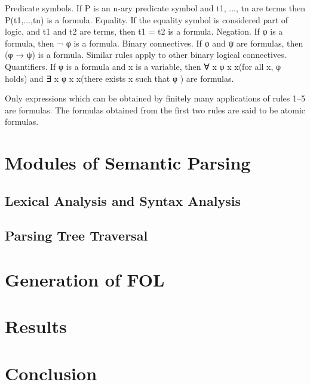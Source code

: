 \documentclass{article}
\begin{document}
{{		Predicate symbols. If P is an n-ary predicate symbol and t1, ..., tn are terms then P(t1,...,tn) is a formula.
		Equality. If the equality symbol is considered part of logic, and t1 and t2 are terms, then t1 = t2 is a formula.
		Negation. If φ is a formula, then ¬ {\displaystyle \lnot } \lnot φ is a formula.
		Binary connectives. If φ and ψ are formulas, then (φ → {\displaystyle \rightarrow } \rightarrow ψ) is a formula. Similar rules apply to other binary logical connectives.
		Quantifiers. If φ {\displaystyle \varphi } \varphi is a formula and x is a variable, then ∀ x φ {\displaystyle \forall x\varphi } \forall x\varphi (for all x, φ {\displaystyle \varphi } \varphi holds) and ∃ x φ {\displaystyle \exists x\varphi } \exists x\varphi (there exists x such that φ {\displaystyle \varphi } \varphi ) are formulas.

		Only expressions which can be obtained by finitely many applications of rules 1–5 are formulas. The formulas obtained from the first two rules are said to be atomic formulas.
	}
}

\section{Modules of Semantic Parsing}{
	\subsection{Lexical Analysis and Syntax Analysis}{}

	\subsection{Parsing Tree Traversal}{}
}

\section{Generation of FOL}{}

\section{Results}{}

\section{Conclusion}{}



\citation
\end{document}

